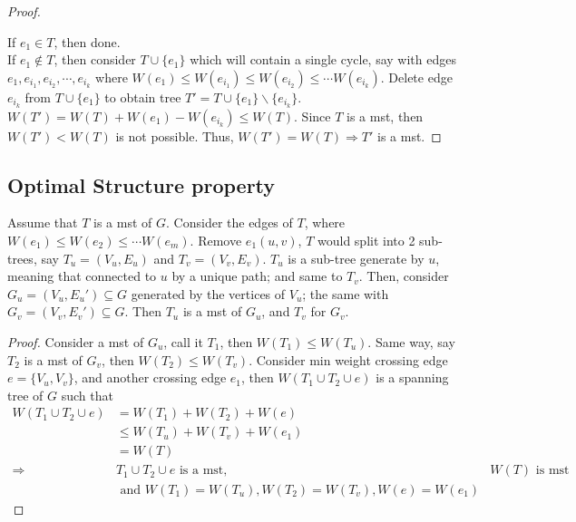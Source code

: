 \documentclass[a4paper]{article}
\begin{document}
\begin{proof}
\begin{center}
\end{center}
If $e_1\in T$, then done. \\
If $e_1\notin T$, then consider $T\cup \{e_1\}$ which will contain a single cycle, say with edges $e_1,e_{i_1},e_{i_2},\cdots, e_{i_k}$ where $W(e_1)\leq W(e_{i_1})\leq W(e_{i_2})\leq \cdots W(e_{i_k})$. Delete edge $e_{i_k}$ from $T\cup \{e_1\}$ to obtain tree $T'=T\cup \{e_1\}\backslash \{e_{i_k}\}$. $W(T')=W(T)+W(e_1)-W(e_{i_k})\leq W(T)$.
Since $T$ is a mst, then $W(T')< W(T)$ is not possible. Thus, $W(T')=W(T)\Rightarrow T'$ is a mst.
\end{proof}
\subsection*{Optimal Structure property}
Assume that $T$ is a mst of $G$. Consider the edges of $T$, where $W(e_1)\leq W(e_2)\leq \cdots W(e_m)$. Remove $e_1(u,v)$, $T$ would split into 2 sub-trees, say $T_u=(V_u,E_u)$ and $T_v=(V_v,E_v)$. $T_u$ is a sub-tree generate by $u$, meaning that connected to $u$ by a unique path; and same to $T_v$. Then, consider $G_u=(V_u,{E_u}')\subseteq G$ generated by the vertices of $V_u$; the same with $G_v=(V_v,{E_v}')\subseteq G$. Then $T_u$ is a mst of $G_u$, and $T_v$ for $G_v$.
\begin{proof}
Consider a mst of $G_u$, call it $T_1$, then $W(T_1)\leq W(T_u)$. Same way, say $T_2$ is a mst of $G_v$, then $W(T_2)\leq W(T_v)$. Consider min weight crossing edge $e=\{V_u,V_v\}$, and another crossing edge $e_1$, then $W(T_1\cup T_2\cup e)$ is a spanning tree of $G$ such that
\begin{align*}
    W(T_1\cup T_2\cup e)&=W(T_1)+W(T_2)+W(e)\\
    &\leq W(T_u)+W(T_v)+W(e_1)\\
    &=W(T)\\
    \Rightarrow&T_1\cup T_2\cup e \text{ is a mst,}& W(T)\text{ is mst}\\
    &\text{ and }W(T_1)=W(T_u),W(T_2)=W(T_v),W(e)=W(e_1)
\end{align*}
\end{proof}
\end{document}
